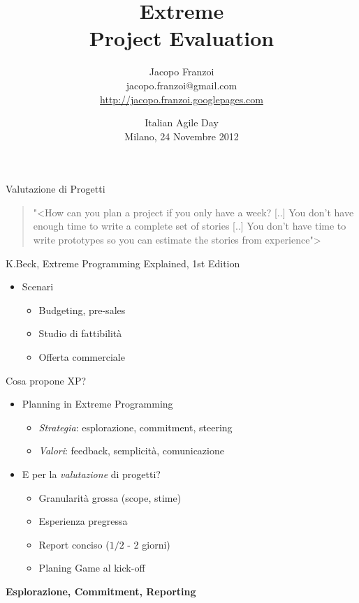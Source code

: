 \documentclass[compress, red, 14pt]{beamer}
\title{ Extreme \\ Project Evaluation }
\author{
	Jacopo Franzoi \\
	{\scriptsize jacopo.franzoi@gmail.com } \\
	{\scriptsize \href{http://jacopo.franzoi.googlepages.com/}{http://jacopo.franzoi.googlepages.com} \\ }
}
\date{
	Italian Agile Day \\
	Milano, 24 Novembre 2012
}
\newcommand{\highlight}[1]{{\color{purple} \emph{#1}}}
\begin{document}
	\begin{frame}
		\titlepage
	\end{frame}

	\begin{frame}{Valutazione di Progetti}
		\begin{quote}
			{\small "<{How can you plan a project if you only have a week? [..] You don't have enough time to write a complete set of stories [..] You don't have time to write prototypes so you can estimate the stories from experience}">}
		\end{quote}
		\hfill {\scriptsize K.Beck, Extreme Programming Explained, 1st Edition}

		\begin{itemize}
			\item Scenari
			\begin{itemize}
				\item Budgeting, pre-sales
				\item Studio di fattibilità
				\item Offerta commerciale
			\end{itemize}
		\end{itemize}
	\end{frame}


	\begin{frame}{Cosa propone XP?}
		\begin{itemize}
			\item Planning in Extreme Programming
			\begin{itemize}
				\item \highlight{Strategia}: esplorazione, commitment, steering
				\item \highlight{Valori}: feedback, semplicità, comunicazione
			\end{itemize}
		\end{itemize}

		\begin{itemize}
			\item E per la \highlight{valutazione} di progetti?
			\begin{itemize}
				\item Granularità grossa (scope, stime)
				\item Esperienza pregressa
				\item Report conciso ($1/2$ - 2 giorni)
				\item Planing Game al kick-off
			\end{itemize}
		\end{itemize}
		
		\begin{center}
			\textbf{Esplorazione, Commitment, Reporting}
		\end{center}
	\end{frame}
\end{document}
